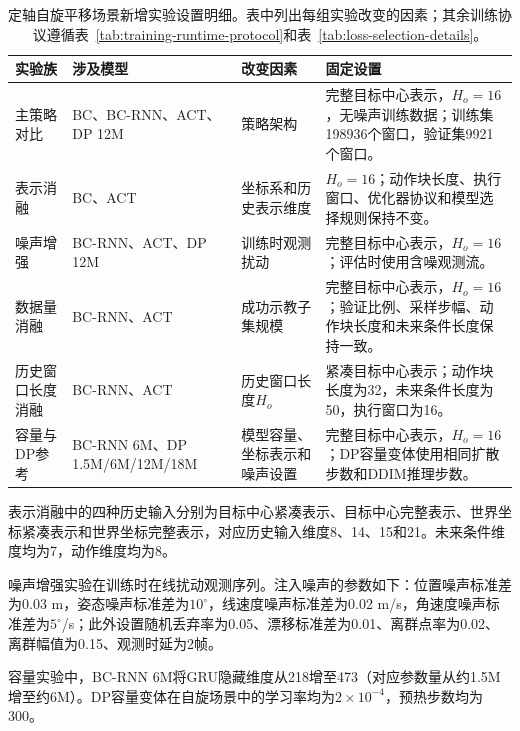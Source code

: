 \begin{table}[!htbp]
    \caption{定轴自旋平移场景新增实验设置明细。表中列出每组实验改变的因素；其余训练协议遵循表~\ref{tab:training-runtime-protocol}和表~\ref{tab:loss-selection-details}。}
    \label{tab:spin-training-details}
    \centering
    \small
    \renewcommand{\arraystretch}{1.15}
    \begin{tabularx}{\textwidth}{>{\raggedright\arraybackslash}p{}>{\raggedright\arraybackslash}p{}YY}
        \hline
        实验族 & 涉及模型 & 改变因素 & 固定设置 \\
        \hline
        主策略对比 & BC、BC-RNN、ACT、DP 12M & 策略架构 & 完整目标中心表示，$H_o=16$，无噪声训练数据；训练集198936个窗口，验证集9921个窗口。 \\
        表示消融 & BC、ACT & 坐标系和历史表示维度 & $H_o=16$；动作块长度、执行窗口、优化器协议和模型选择规则保持不变。 \\
        噪声增强 & BC-RNN、ACT、DP 12M & 训练时观测扰动 & 完整目标中心表示，$H_o=16$；评估时使用含噪观测流。 \\
        数据量消融 & BC-RNN、ACT & 成功示教子集规模 & 完整目标中心表示，$H_o=16$；验证比例、采样步幅、动作块长度和未来条件长度保持一致。 \\
        历史窗口长度消融 & BC-RNN、ACT & 历史窗口长度$H_o$ & 紧凑目标中心表示；动作块长度为32，未来条件长度为50，执行窗口为16。 \\
        容量与DP参考 & BC-RNN 6M、DP 1.5M/6M/12M/18M & 模型容量、坐标表示和噪声设置 & 完整目标中心表示，$H_o=16$；DP容量变体使用相同扩散步数和DDIM推理步数。 \\
        \hline
    \end{tabularx}
\end{table}

表示消融中的四种历史输入分别为目标中心紧凑表示、目标中心完整表示、世界坐标紧凑表示和世界坐标完整表示，对应历史输入维度8、14、15和21。未来条件维度均为7，动作维度均为8。

噪声增强实验在训练时在线扰动观测序列。注入噪声的参数如下：位置噪声标准差为0.03 m，姿态噪声标准差为$10^\circ$，线速度噪声标准差为0.02 m/s，角速度噪声标准差为$5^\circ$/s；此外设置随机丢弃率为0.05、漂移标准差为0.01、离群点率为0.02、离群幅值为0.15、观测时延为2帧。

容量实验中，BC-RNN 6M将GRU隐藏维度从218增至473（对应参数量从约1.5M增至约6M）。DP容量变体在自旋场景中的学习率均为$2\times10^{-4}$，预热步数均为300。

